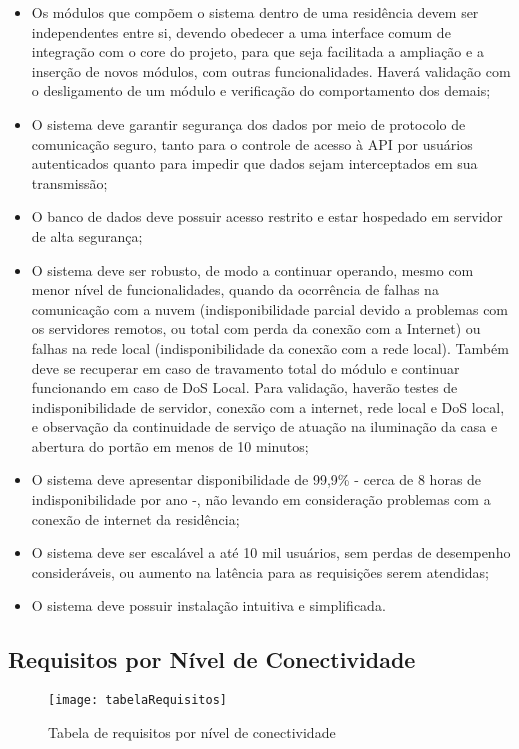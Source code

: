 \begin{itemize}
\item Os módulos que compõem o sistema dentro de uma residência devem ser independentes entre si, devendo obedecer a uma interface comum de integração com o core do projeto, para que seja facilitada a ampliação e a inserção de novos módulos, com outras funcionalidades. Haverá validação com o desligamento de um módulo e verificação do comportamento dos demais;
\item O sistema deve garantir segurança dos dados por meio de protocolo de comunicação seguro, tanto para o controle de acesso à API por usuários autenticados quanto para impedir que dados sejam interceptados em sua transmissão;
\item O banco de dados deve possuir acesso restrito e estar hospedado em servidor de alta segurança;
\item O sistema deve ser robusto, de modo a continuar operando, mesmo com menor nível de funcionalidades, quando da ocorrência de falhas na comunicação com a nuvem (indisponibilidade parcial devido a problemas com os servidores remotos, ou total com perda da conexão com a Internet) ou falhas na rede local (indisponibilidade da conexão com a rede local). Também deve se recuperar em caso de travamento total do módulo e continuar funcionando em caso de DoS Local. Para validação, haverão testes de indisponibilidade de servidor, conexão com a internet, rede local e DoS local, e observação da continuidade de serviço de atuação na iluminação da casa e abertura do portão em menos de 10 minutos;
\item O sistema deve apresentar disponibilidade de 99,9\% - cerca de 8 horas de indisponibilidade por ano -, não levando em consideração problemas com a conexão de internet da residência;
\item O sistema deve ser escalável a até 10 mil usuários, sem perdas de desempenho consideráveis, ou aumento na latência para as requisições serem atendidas;
\item O sistema deve possuir instalação intuitiva e simplificada.
\end{itemize}

\subsection{Requisitos por Nível de Conectividade}

\begin{figure}[H]
	\centering
	\caption{Tabela de requisitos por nível de conectividade}
  \texttt{[image: tabelaRequisitos]}
\label{fig:tabelaRequisitos}
\end{figure}
